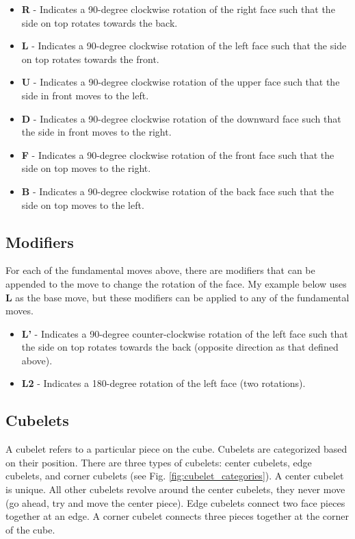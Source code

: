 \documentclass[final, letterpaper, 10 pt, conference, onecolumn]{IEEEtran}
\begin{document}
\begin{itemize}

\item{\textbf{R}} - Indicates a 90-degree clockwise rotation of the right face such that the side on top rotates towards the back.
\item{\textbf{L}} - Indicates a 90-degree clockwise rotation of the left face such that the side on top rotates towards the front.
\item{\textbf{U}} - Indicates a 90-degree clockwise rotation of the upper face such that the side in front moves to the left.
\item{\textbf{D}} - Indicates a 90-degree clockwise rotation of the downward face such that the side in front moves to the right.
\item{\textbf{F}} - Indicates a 90-degree clockwise rotation of the front face such that the side on top moves to the right.
\item{\textbf{B}} - Indicates a 90-degree clockwise rotation of the back face such that the side on top moves to the left.
\end{itemize}

\subsection{Modifiers}
For each of the fundamental moves above, there are modifiers that can be appended to the move to change the rotation of the face. My example below uses \textbf{L} as the base move, but these modifiers can be applied to any of the fundamental moves.

\begin{itemize}
\item \textbf{L'} - Indicates a 90-degree counter-clockwise rotation of the left face such that the side on top rotates towards the back (opposite direction as that defined above).
\item \textbf{L2} - Indicates a 180-degree rotation of the left face (two rotations).
\end{itemize}

\subsection{Cubelets}
A cubelet refers to a particular piece on the cube. Cubelets are categorized based on their position. There are three types of cubelets: center cubelets, edge cubelets, and corner cubelets (see Fig. \ref{fig:cubelet_categories}). A center cubelet is unique. All other cubelets revolve around the center cubelets, they never move (go ahead, try and move the center piece). Edge cubelets connect two face pieces together at an edge. A corner cubelet connects three pieces together at the corner of the cube.
\end{document}

